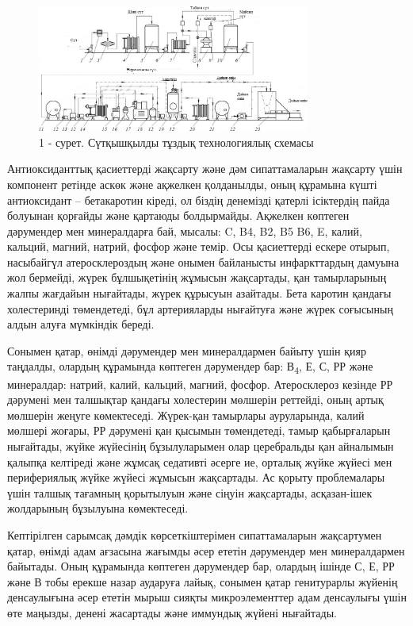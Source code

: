 \begin{figure}[H]
	\centering
	\includegraphics[width=0.8\textwidth]{media/pish2/image24}
	\caption*{1 - сурет. Сүтқышқылды тұздық технологиялық схемасы}
\end{figure}

Антиоксиданттық қасиеттерді жақсарту және дәм сипаттамаларын жақсарту
үшін компонент ретінде аскөк және ақжелкен қолданылды, оның құрамына
күшті антиоксидант -- бетакаротин кіреді, ол біздің денемізді қатерлі
ісіктердің пайда болуынан қорғайды және қартаюды болдырмайды. Ақжелкен
көптеген дәрумендер мен минералдарға бай, мысалы: C, B4, B2, B5 B6, E,
калий, кальций, магний, натрий, фосфор және темір. Осы қасиеттерді
ескере отырып, насыбайгүл атеросклероздың және онымен байланысты
инфаркттардың дамуына жол бермейді, жүрек бұлшықетінің жұмысын
жақсартады, қан тамырларының жалпы жағдайын нығайтады, жүрек құрысуын
азайтады. Бета каротин қандағы холестеринді төмендетеді, бұл
артерияларды нығайтуға және жүрек соғысының алдын алуға мүмкіндік
береді.

Сонымен қатар, өнімді дәрумендер мен минералдармен байыту үшін қияр
таңдалды, олардың құрамында көптеген дәрумендер бар: В\textsubscript{4},
Е, С, РР және минералдар: натрий, калий, кальций, магний, фосфор.
Атеросклероз кезінде РР дәрумені мен талшықтар қандағы холестерин
мөлшерін реттейді, оның артық мөлшерін жеңуге көмектеседі. Жүрек-қан
тамырлары ауруларында, калий мөлшері жоғары, РР дәрумені қан қысымын
төмендетеді, тамыр қабырғаларын нығайтады, жүйке жүйесінің бұзылуларымен
олар церебральды қан айналымын қалыпқа келтіреді және жұмсақ седативті
әсерге ие, орталық жүйке жүйесі мен перифериялық жүйке жүйесі жұмысын
жақсартады. Ас қорыту проблемалары үшін талшық тағамның қорытылуын және
сіңуін жақсартады, асқазан-ішек жолдарының бұзылуына көмектеседі.

Кептірілген сарымсақ дәмдік көрсеткіштерімен сипаттамаларын жақсартумен
қатар, өнімді адам ағзасына жағымды әсер ететін дәрумендер мен
минералдармен байытады. Оның құрамында көптеген дәрумендер бар, олардың
ішінде С, Е, РР және В тобы ерекше назар аударуға лайық, сонымен қатар
генитурарлы жүйенің денсаулығына әсер ететін мырыш сияқты
микроэлементтер адам денсаулығы үшін өте маңызды, денені жасартады және
иммундық жүйені нығайтады.

